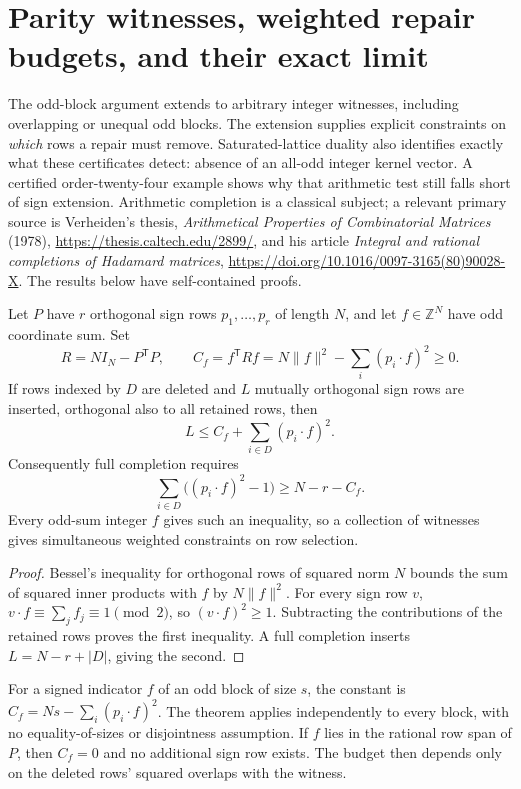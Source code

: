 \section{Parity witnesses, weighted repair budgets, and their exact limit}
\label{s17:sec:parity-repair}

The odd-block argument extends to arbitrary integer witnesses, including
overlapping or unequal odd blocks. The extension supplies explicit
constraints on \emph{which} rows a repair must remove. Saturated-lattice
duality also identifies exactly what these certificates detect: absence
of an all-odd integer kernel vector. A certified order-twenty-four
example shows why that arithmetic test still falls short of sign
extension. Arithmetic completion is a classical subject; a relevant
primary source is Verheiden's thesis,
\emph{Arithmetical Properties of Combinatorial Matrices} (1978),
\url{https://thesis.caltech.edu/2899/}, and his article
\emph{Integral and rational completions of Hadamard matrices},
\url{https://doi.org/10.1016/0097-3165(80)90028-X}.
The results below have self-contained proofs.

\begin{theorem}
Let $P$ have $r$ orthogonal sign rows $p_1,\ldots,p_r$ of length $N$,
and let $f\in\mathbb Z^N$ have odd coordinate sum. Set
\[
 R=NI_N-P^{\mathsf T}P,\qquad
 C_f=f^{\mathsf T}Rf
     =N\|f\|^2-\sum_i(p_i\cdot f)^2\ge0.
\]
If rows indexed by $D$ are deleted and $L$ mutually orthogonal sign
rows are inserted, orthogonal also to all retained rows, then
\[
 L\le C_f+\sum_{i\in D}(p_i\cdot f)^2.
\]
Consequently full completion requires
\[
 \sum_{i\in D}\bigl((p_i\cdot f)^2-1\bigr)
       \ge N-r-C_f.
\]
Every odd-sum integer $f$ gives such an inequality, so a collection
of witnesses gives simultaneous weighted constraints on row selection.
\end{theorem}
\begin{proof}
Bessel's inequality for orthogonal rows of squared norm $N$ bounds
the sum of squared inner products with $f$ by $N\|f\|^2$.
For every sign row $v$, $v\cdot f\equiv\sum_j f_j\equiv1\pmod2$,
so $(v\cdot f)^2\ge1$. Subtracting the contributions of the retained
rows proves the first inequality. A full completion inserts
$L=N-r+|D|$, giving the second.
\end{proof}

For a signed indicator $f$ of an odd block of size $s$, the constant
is $C_f=Ns-\sum_i(p_i\cdot f)^2$. The theorem applies independently
to every block, with no equality-of-sizes or disjointness assumption.
If $f$ lies in the rational row span of $P$, then $C_f=0$ and no
additional sign row exists. The budget then depends only on the
deleted rows' squared overlaps with the witness.

